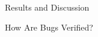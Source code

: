 \begin{section}{Results and Discussion}
\begin{subsection}{How Are Bugs Verified?}



	
\end{subsection}

\end{section}

